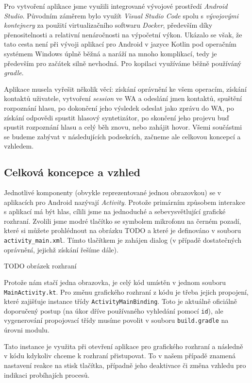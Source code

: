 Pro vytvoření aplikace jsme využili integrované vývojové prostředí
\textit{Android Studio}. Původním záměrem bylo využít \textit{Visual Studio Code}
spolu s \textit{vývojovými kontejnery} za použití virtualizačního softwaru
\textit{Docker}, především díky přenositelnosti a relativní nenáročnosti
na výpočetní výkon. Ukázalo se však, že tato cesta není při vývoji aplikací
pro Android v jazyce Kotlin pod operačním systémem Windows úplně běžná a
naráží na mnoho komplikací, tedy je především pro začátek silně nevhodná.
Pro kopilaci využíváme běžně používáný \textit{gradle}.

Aplikace musela vyřešit několik věcí: získání oprávnění ke všem operacím,
získání kontaktů uživatele, vytvoření \textit{session} ve WA a odeslání
jmen kontaktů, spuštění rozpoznání hlasu, po dokončení jeho výsledek odeslat
jako zprávu do WA, po získání odpovědi spustit hlasový syntetizátor, po skončení
jeho projevu buď spustit rozpoznání hlasu a celý běh znovu, nebo zahájit
hovor. Všemi součástmi se budeme zabývat v následujících podsekcích, začneme
ale celkovou koncepcí a vzhledem.

\subsection{Celková koncepce a vzhled}

Jednotlivé komponenty (obvykle reprezentované jednou obrazovkou)
se v aplikacích
pro Android nazývají \textit{Activity}. Protože primárním způsobem interakce
s aplikací má být hlas, cílili jsme na jednoduché a sebevysvětlující grafické
rozhraní. Zvolili jsme modré tlačítko se symbolem mikrofonu na černém pozadí,
které si můžete prohlédnout na obrázku TODO a které je definováno v souboru
\texttt{activity\_main.xml}. Tímto tlačítkem je zahájen dialog (v případě
dostatečných oprávnění, jejichž získání řešíme dále).

TODO obrázek rozhraní

Protože nám stačí jedna obrazovka, je celý kód umístěn v jednom souboru
\texttt{MainActivity.kt}. Pro změnu grafického rozhraní z kódu je třeba
jejich propojení, které zajišťuje instance třídy \texttt{ActivityMainBinding}.
Toto je aktuálně oficiálně doporučený postup (na úkor dříve používaného
vyhledání pomocí \texttt{id}), ale vygenerování propojovací třídy musíme
povolit v souboru \texttt{build.gradle} na úrovni modulu.

Tato instance je využita při otevření aplikace pro  grafického
rozhraní a následně v kódu kdykoliv chceme k rozhraní přistupovat. To v našem
případě znamená nastavení reakce na stisk tlačítka, případně jeho deaktivace
či změna vzhledu pro indikaci probíhajích procesů.

